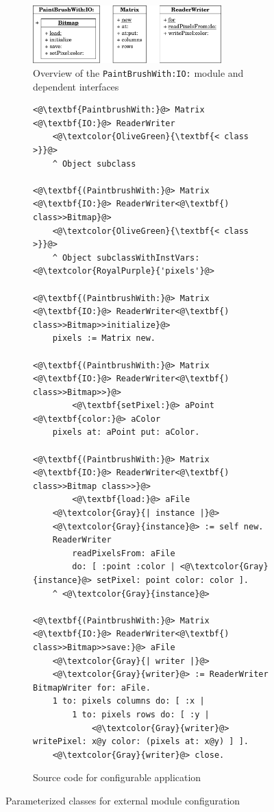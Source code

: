 \begin{figure}[!htp]
\begin{subfigure}[b]{\textwidth}
\centering
\includegraphics[width=0.8\textwidth]{usecase_paintbrush.pdf}
\caption{Overview of the \texttt{PaintBrushWith:IO:} module and dependent interfaces}
\end{subfigure}

\vspace{10pt}

\begin{subfigure}[b]{\textwidth}
\begin{lstlisting}
<@\textbf{PaintbrushWith:}@> Matrix <@\textbf{IO:}@> ReaderWriter
    <@\textcolor{OliveGreen}{\textbf{< class >}}@>
    ^ Object subclass

<@\textbf{(PaintbrushWith:}@> Matrix <@\textbf{IO:}@> ReaderWriter<@\textbf{) class>>Bitmap}@>
    <@\textcolor{OliveGreen}{\textbf{< class >}}@>
    ^ Object subclassWithInstVars: <@\textcolor{RoyalPurple}{'pixels'}@>

<@\textbf{(PaintbrushWith:}@> Matrix <@\textbf{IO:}@> ReaderWriter<@\textbf{) class>>Bitmap>>initialize}@>
    pixels := Matrix new.

<@\textbf{(PaintbrushWith:}@> Matrix <@\textbf{IO:}@> ReaderWriter<@\textbf{) class>>Bitmap>>}@>
        <@\textbf{setPixel:}@> aPoint <@\textbf{color:}@> aColor
    pixels at: aPoint put: aColor.

<@\textbf{(PaintbrushWith:}@> Matrix <@\textbf{IO:}@> ReaderWriter<@\textbf{) class>>Bitmap class>>}@>
        <@\textbf{load:}@> aFile
    <@\textcolor{Gray}{| instance |}@>
    <@\textcolor{Gray}{instance}@> := self new.
    ReaderWriter 
        readPixelsFrom: aFile
        do: [ :point :color | <@\textcolor{Gray}{instance}@> setPixel: point color: color ].
    ^ <@\textcolor{Gray}{instance}@>

<@\textbf{(PaintbrushWith:}@> Matrix <@\textbf{IO:}@> ReaderWriter<@\textbf{) class>>Bitmap>>save:}@> aFile
    <@\textcolor{Gray}{| writer |}@>
    <@\textcolor{Gray}{writer}@> := ReaderWriter BitmapWriter for: aFile.
    1 to: pixels columns do: [ :x |
        1 to: pixels rows do: [ :y | 
            <@\textcolor{Gray}{writer}@> writePixel: x@y color: (pixels at: x@y) ] ].
    <@\textcolor{Gray}{writer}@> close.
\end{lstlisting}
\caption{Source code for configurable application}
\end{subfigure}
\caption{Parameterized classes for external module configuration}
\label{fig:use_paintbrush}
\end{figure}

